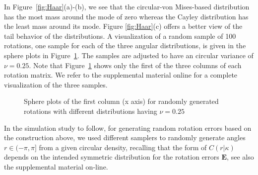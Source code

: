 In Figure~\ref{fig:Haar}(a)-(b), we see that the circular-von Mises-based distribution has the most mass around the mode of zero whereas the Cayley distribution has the least mass around its mode.      Figure \ref{fig:Haar}(c) offers a better view of the tail behavior of the distributions.  A visualization of a random sample of 100 rotations, one sample for each of the three angular distributions, is given in the sphere plots in Figure~\ref{eyeballs}. The samples are adjusted to have an circular variance of $\nu = 0.25$.  Note that Figure~\ref{eyeballs} shows only the first of the three columns of each rotation matrix. We refer to the supplemental material online for a complete visualization of the three samples.
\begin{figure}[htbp]
\centering
{}
\caption{\label{eyeballs}Sphere plots of the first column (x axis) for randomly generated rotations with different distributions having  $\nu = 0.25$}
\end{figure}
In the simulation study to follow, for generating random rotation errors based on the construction above, we used different samplers to randomly generate angles $r\in(-\pi,\pi]$ from a given circular density, recalling that the form of $C(r|\kappa)$ depends on the intended symmetric distribution for the rotation errors $\bm{E}$, see also the supplemental material on-line.



